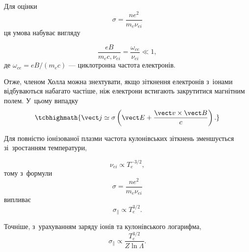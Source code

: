 Для оцінки
\begin{equation*}
\sigma=\frac{ne^2}{m_e\nu_{ei}}
\end{equation*}
ця умова набуває вигляду

\begin{equation*}
\frac{eB}{m_ec,\nu_{ei}}
=\frac{\omega_{ce}}{\nu_{ei}}\ll1,
\end{equation*}
де $\omega_{ce}=eB/(m_ec)$ --- циклотронна частота електронів.

Отже, членом Холла можна знехтувати, якщо зіткнення електронів з~іонами відбуваються набагато частіше, ніж електрони встигають закрутитися магнітним полем. У~цьому випадку
\begin{equation}
\tcbhighmath{
\vect j\simeq\sigma
\left(\vect E+\frac{\vect v\times\vect B}{c}\right).
}
\end{equation}

Для повністю іонізованої плазми частота кулонівських зіткнень зменшується зі~зростанням температури,

\begin{equation*}
\nu_{ei}\propto T_e^{-3/2},
\end{equation*}
тому з~формули
\begin{equation*}
\sigma=\frac{ne^2}{m_e\nu_{ei}}
\end{equation*}
випливає
\begin{equation*}
\sigma_\parallel\propto T_e^{3/2}.
\end{equation*}

Точніше, з~урахуванням заряду іонів та кулонівського логарифма,
\begin{equation*}
\sigma_\parallel\propto
\frac{T_e^{3/2}}{Z\ln\Lambda}.
\end{equation*}

